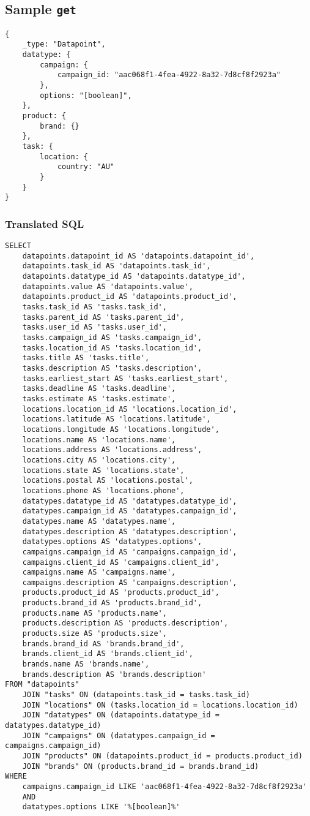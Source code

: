 \documentclass{article}
\newcommand{\ilcode}{\tt}
\begin{document}
\subsection{Sample {\ilcode get}}
\linespread{1}
\begin{lstlisting}
{
	_type: "Datapoint",
	datatype: {
		campaign: {
			campaign_id: "aac068f1-4fea-4922-8a32-7d8cf8f2923a"
		},
		options: "[boolean]",
	},
	product: {
		brand: {}
	},
	task: {
		location: {
			country: "AU"
		}
	}
}
\end{lstlisting}
\subsubsection{Translated SQL}
\begin{lstlisting}
SELECT
	datapoints.datapoint_id AS 'datapoints.datapoint_id',
	datapoints.task_id AS 'datapoints.task_id',
	datapoints.datatype_id AS 'datapoints.datatype_id',
	datapoints.value AS 'datapoints.value',
	datapoints.product_id AS 'datapoints.product_id',
	tasks.task_id AS 'tasks.task_id',
	tasks.parent_id AS 'tasks.parent_id',
	tasks.user_id AS 'tasks.user_id',
	tasks.campaign_id AS 'tasks.campaign_id',
	tasks.location_id AS 'tasks.location_id',
	tasks.title AS 'tasks.title',
	tasks.description AS 'tasks.description',
	tasks.earliest_start AS 'tasks.earliest_start',
	tasks.deadline AS 'tasks.deadline',
	tasks.estimate AS 'tasks.estimate',
	locations.location_id AS 'locations.location_id',
	locations.latitude AS 'locations.latitude',
	locations.longitude AS 'locations.longitude',
	locations.name AS 'locations.name',
	locations.address AS 'locations.address',
	locations.city AS 'locations.city',
	locations.state AS 'locations.state',
	locations.postal AS 'locations.postal',
	locations.phone AS 'locations.phone',
	datatypes.datatype_id AS 'datatypes.datatype_id',
	datatypes.campaign_id AS 'datatypes.campaign_id',
	datatypes.name AS 'datatypes.name',
	datatypes.description AS 'datatypes.description',
	datatypes.options AS 'datatypes.options',
	campaigns.campaign_id AS 'campaigns.campaign_id',
	campaigns.client_id AS 'campaigns.client_id',
	campaigns.name AS 'campaigns.name',
	campaigns.description AS 'campaigns.description',
	products.product_id AS 'products.product_id',
	products.brand_id AS 'products.brand_id',
	products.name AS 'products.name',
	products.description AS 'products.description',
	products.size AS 'products.size',
	brands.brand_id AS 'brands.brand_id',
	brands.client_id AS 'brands.client_id',
	brands.name AS 'brands.name',
	brands.description AS 'brands.description'
FROM "datapoints"
	JOIN "tasks" ON (datapoints.task_id = tasks.task_id)
	JOIN "locations" ON (tasks.location_id = locations.location_id)
	JOIN "datatypes" ON (datapoints.datatype_id = datatypes.datatype_id)
	JOIN "campaigns" ON (datatypes.campaign_id = campaigns.campaign_id)
	JOIN "products" ON (datapoints.product_id = products.product_id)
	JOIN "brands" ON (products.brand_id = brands.brand_id)
WHERE
	campaigns.campaign_id LIKE 'aac068f1-4fea-4922-8a32-7d8cf8f2923a'
	AND
	datatypes.options LIKE '%[boolean]%'
\end{lstlisting}
\end{document}
